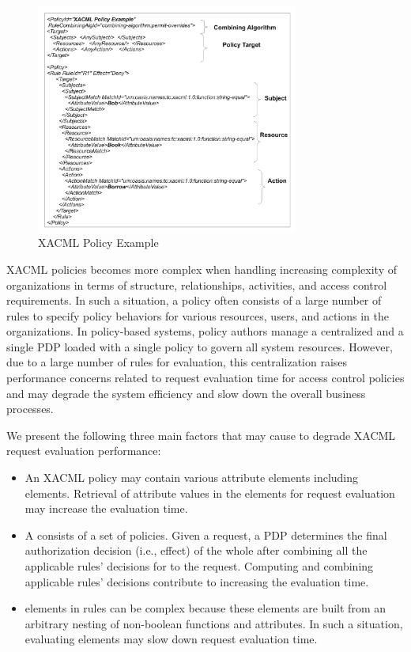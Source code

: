 \begin{figure}[!h]
\begin{center}
\includegraphics[width=8.6cm]{xacml}
\caption{XACML Policy Example}
\label{figur1}
\end{center}
\end{figure}


XACML policies becomes more complex when handling increasing complexity of organizations in terms of structure, relationships, activities, and access control requirements. In such a situation, a policy 
often consists of a large number of rules to specify policy behaviors for various resources, users, and actions in the organizations.
In policy-based systems, policy authors manage a centralized and a single PDP loaded with a single policy to govern all system resources. 
However, due to a large number of rules for evaluation, this centralization raises performance concerns related to request evaluation time for access control policies and may 
degrade the system efficiency and slow down the overall business processes. 

We present the following three main factors that may cause to degrade XACML request evaluation performance: 

\begin{itemize}
\item An XACML policy may contain various attribute elements including  elements. Retrieval of
attribute values in the  elements for request evaluation may increase the evaluation time.
\item A  consists of a set of policies. Given a request, a PDP determines the final authorization decision (i.e., effect) of 
the whole  after combining all the applicable rules' decisions for to the request.
Computing and combining applicable rules' decisions contribute to increasing the evaluation time.
\item {} elements in rules can be complex because these elements are built from an arbitrary nesting of non-boolean functions and attributes. 
In such a situation, evaluating  elements may slow down request evaluation time.
\end{itemize}

